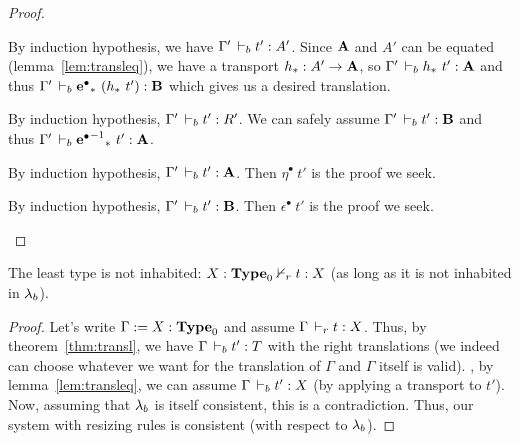 \documentclass[a4paper,english]{lipics-utf8x}
\begin{document}
\begin{proof}
\begin{caselist}
      \nextcase
      \begin{mathc}
      \end{mathc}
      By induction hypothesis, we have $\Gamma' \,\vdash_b t' : A'$.
      Since $\operatorname{\mathbf{A}}$ and $A'$ can be equated (lemma~\ref{lem:transleq}),
      we have a transport $h_* : A' \to \operatorname{\mathbf{A}}$, so
      $\Gamma' \,\vdash_b h_*\ t' : \operatorname{\mathbf{A}}$ and thus
      $\Gamma' \,\vdash_b \operatorname{\operatorname{\mathbf{e}}^\bullet}_*\ (h_*\ t') : \operatorname{\mathbf{B}}$ which gives us a desired
      translation.

      \nextcase
      \begin{mathc}
      \end{mathc}
      By induction hypothesis, $\Gamma' \,\vdash_b t' : R'$.
      We can safely assume $\Gamma' \,\vdash_b t' : \operatorname{\mathbf{B}}$ and thus
      $\Gamma' \,\vdash_b {\operatorname{\operatorname{\mathbf{e}}^\bullet}^{-1}}_*\ t' : \operatorname{\mathbf{A}}$.

      \nextcase
      \begin{mathc}
      \end{mathc}
      By induction hypothesis, $\Gamma' \,\vdash_b t' : \operatorname{\mathbf{A}}$.
      Then $\eta^\bullet\ t'$ is the proof we seek.

      \nextcase
      \begin{mathc}
      \end{mathc}
      By induction hypothesis, $\Gamma' \,\vdash_b t' : \operatorname{\mathbf{B}}$.
      Then $\epsilon^\bullet\ t'$ is the proof we seek.
    \end{caselist}
  \end{proof}

  \begin{corollary}
    \label{cor:cons1}
    The least type is not inhabited: $X : \operatorname{\mathbf{Type}}_0 \nvdash_r t : X$
    (as long as it is not inhabited in $\lambda_b$).
  \end{corollary}

  \begin{proof}
    Let's write $\Gamma := X : \operatorname{\mathbf{Type}}_0$ and assume $\Gamma \,\vdash_r t : X$.
    Thus, by theorem~\ref{thm:transl}, we have $\Gamma \,\vdash_b t' : T$ with
    the right translations (we indeed can choose whatever we want for the
    translation of $\Gamma$ and $\Gamma$ itself is valid).
    \Wlog, by lemma~\ref{lem:transleq}, we can assume
    $\Gamma \,\vdash_b t' : X$ (by applying a transport to $t'$).
    Now, assuming that $\lambda_b$ is itself consistent, this is a contradiction.
    Thus, our system with resizing rules is consistent (with respect to $\lambda_b$).
  \end{proof}
\end{document}
